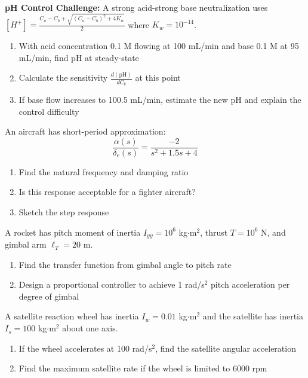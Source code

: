 \begin{exercise}
\textbf{pH Control Challenge:} A strong acid-strong base neutralization uses $[H^+] = \frac{C_a - C_b + \sqrt{(C_a - C_b)^2 + 4K_w}}{2}$ where $K_w = 10^{-14}$.
\begin{enumerate}[label=(\alph*)]
    \item With acid concentration 0.1 M flowing at 100 mL/min and base 0.1 M at 95 mL/min, find pH at steady-state
    \item Calculate the sensitivity $\frac{d(\text{pH})}{dC_b}$ at this point
    \item If base flow increases to 100.5 mL/min, estimate the new pH and explain the control difficulty
\end{enumerate}
\end{exercise}


\begin{exercise}
An aircraft has short-period approximation:
\begin{equation}
\frac{\alpha(s)}{\delta_e(s)} = \frac{-2}{s^2 + 1.5s + 4}
\end{equation}
\begin{enumerate}[label=(\alph*)]
    \item Find the natural frequency and damping ratio
    \item Is this response acceptable for a fighter aircraft?
    \item Sketch the step response
\end{enumerate}
\end{exercise}

\begin{exercise}
A rocket has pitch moment of inertia $I_{yy} = 10^6$ kg$\cdot$m$^2$, thrust $T = 10^6$ N, and gimbal arm $\ell_T = 20$ m.
\begin{enumerate}[label=(\alph*)]
    \item Find the transfer function from gimbal angle to pitch rate
    \item Design a proportional controller to achieve 1 rad/s$^2$ pitch acceleration per degree of gimbal
\end{enumerate}
\end{exercise}

\begin{exercise}
A satellite reaction wheel has inertia $I_w = 0.01$ kg$\cdot$m$^2$ and the satellite has inertia $I_s = 100$ kg$\cdot$m$^2$ about one axis.
\begin{enumerate}[label=(\alph*)]
    \item If the wheel accelerates at 100 rad/s$^2$, find the satellite angular acceleration
    \item Find the maximum satellite rate if the wheel is limited to 6000 rpm
\end{enumerate}
\end{exercise}

